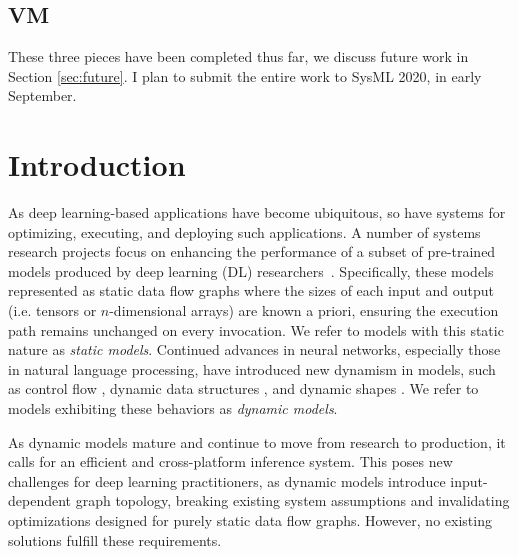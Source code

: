 
\subsection{VM}

These three pieces have been completed thus far, we discuss future work in Section
\ref{sec:future}. I plan to submit the entire work to SysML 2020, in early September.


\section{Introduction}
\label{sec:Relay-intro}

As deep learning-based applications have become ubiquitous, so have systems for optimizing, executing, and deploying such applications. A number of systems research projects focus on enhancing the performance of a subset of pre-trained models produced by deep learning (DL) researchers~\citep{Dahl2011taslp, yu2011improved, han2016isca, NIPS2016johnson}.
Specifically, these models represented as static data flow graphs where the sizes of each input and output (i.e. tensors or $n$-dimensional arrays) are known a priori, ensuring the execution path remains unchanged on every invocation.
We refer to models with this static nature as \emph{static models}.
Continued advances in neural networks, especially those in natural language processing, have introduced new dynamism in models, such as control flow \citep{lstm, language_model}, dynamic data structures \citep{tree_lstm, graph_lstm}, and dynamic shapes \citep{devlin2018bert}. We refer to models exhibiting these behaviors as {\em dynamic models}.

As dynamic models mature and continue to move from research to production, it calls for an efficient and cross-platform inference system.
This poses new challenges for deep learning practitioners, as dynamic models introduce input-dependent graph topology, breaking existing system assumptions and invalidating optimizations designed for purely static data flow graphs.
However, no existing solutions fulfill these requirements.

